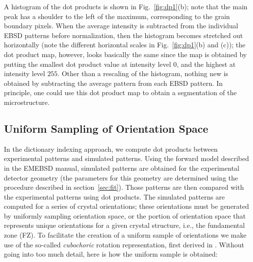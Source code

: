 \documentclass[DIV=calc, paper=letter, fontsize=11pt]{scrartcl}	 %
\begin{document}
A histogram of the dot products is shown in Fig.~\ref{fig:dp1}(b); note that the main peak has a shoulder to the left of the maximum, corresponding to
the grain boundary pixels.  When the average intensity is subtracted from the individual EBSD patterns before normalization, then the histogram
becomes stretched out horizontally (note the different horizontal scales in Fig.~\ref{fig:dp1}(b) and (c)); the dot product map, however, looks basically
the same since the map is obtained by putting the smallest dot product value at intensity level $0$, and the highest at intensity level $255$.  Other than a 
rescaling of the histogram, nothing new is obtained by subtracting the average pattern from each EBSD pattern.  In principle, one could use this dot product map
to obtain a segmentation of the microstructure.

\subsection{Uniform Sampling of Orientation Space\label{sec:uniform}}
In the dictionary indexing approach, we compute dot products between experimental patterns and simulated patterns.  Using the forward model
described in the \textsf{EMEBSD} manual, simulated patterns are obtained for the experimental detector geometry (the parameters for this geometry
are determined using the procedure described in section~\ref{sec:fit}).  Those patterns are then 
compared with the experimental patterns using dot products.  The simulated patterns are computed for a series of crystal orientations; these 
orientations must be generated by uniformly sampling orientation space, or the portion of orientation space that represents unique orientations for 
a given crystal structure, i.e., the fundamental zone (FZ).  To facilitate the creation of a uniform sample of orientations we make use of the 
so-called \textit{cubochoric} rotation representation, first derived in \cite{degraef2014r}.  Without going into too much detail, here is how the uniform 
sample is obtained:
\end{document}
